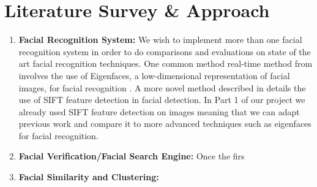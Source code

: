 \documentclass[11pt]{article} %
\theoremstyle{plain}
\theoremstyle{definition}
\theoremstyle{remark}
\numberwithin{equation}{section} %
\numberwithin{figure}{section} %
\numberwithin{table}{section} %
\begin{document}


\section{Literature Survey \& Approach}




\begin{enumerate}
  \item \textbf{Facial Recognition System:} We wish to implement more than one facial recognition system in order to do comparisons and evaluations on state of the art facial recognition techniques. One common method real-time method from involves the use of Eigenfaces, a low-dimensional representation of facial images, for facial recognition \citep{turk1991eigenfaces}. A more novel method described in \citep{krivzaj2010adaptation} details the use of SIFT feature detection in facial detection. In Part 1 of our project we already used SIFT feature detection on images meaning that we can adapt previous work and compare it to more advanced techniques such as eigenfaces for facial recognition.

  \item \textbf{Facial Verification/Facial Search Engine:} 
  Once the firs

  \item \textbf{Facial Similarity and Clustering:}
\end{enumerate}
\end{document}
